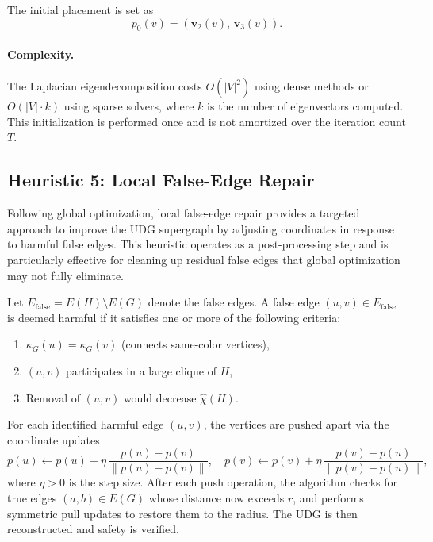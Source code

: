 \documentclass[11pt]{article}
\newcommand{\Efalse}{E_{\mathrm{false}}}
\newcommand{\chihat}{\widehat{\chi}}
\begin{document}
The initial placement is set as
\[
p_0(v) = (\mathbf{v}_2(v), \, \mathbf{v}_3(v)).
\]

\paragraph{Complexity.}
The Laplacian eigendecomposition costs $O(|V|^2)$ using dense methods or $O(|V| \cdot k)$ using sparse solvers, where $k$ is the number of eigenvectors computed. This initialization is performed once and is not amortized over the iteration count $T$.

\newpage

\subsection{Heuristic 5: Local False-Edge Repair}

Following global optimization, local false-edge repair provides a targeted approach to improve the UDG supergraph by adjusting coordinates in response to harmful false edges. This heuristic operates as a post-processing step and is particularly effective for cleaning up residual false edges that global optimization may not fully eliminate.

Let $\Efalse = E(H) \setminus E(G)$ denote the false edges. A false edge $(u,v) \in \Efalse$ is deemed harmful if it satisfies one or more of the following criteria:
\begin{enumerate}
  \item $\kappa_G(u) = \kappa_G(v)$ (connects same-color vertices),
  \item $(u,v)$ participates in a large clique of $H$,
  \item Removal of $(u,v)$ would decrease $\chihat(H)$.
\end{enumerate}

For each identified harmful edge $(u,v)$, the vertices are pushed apart via the coordinate updates
\[
p(u) \leftarrow p(u) + \eta\,\frac{p(u)-p(v)}{\|p(u)-p(v)\|},\quad
p(v) \leftarrow p(v) + \eta\,\frac{p(v)-p(u)}{\|p(v)-p(u)\|},
\]
where $\eta>0$ is the step size. After each push operation, the algorithm checks for true edges $(a,b)\in E(G)$ whose distance now exceeds $r$, and performs symmetric pull updates to restore them to the radius. The UDG is then reconstructed and safety is verified.
\end{document}
